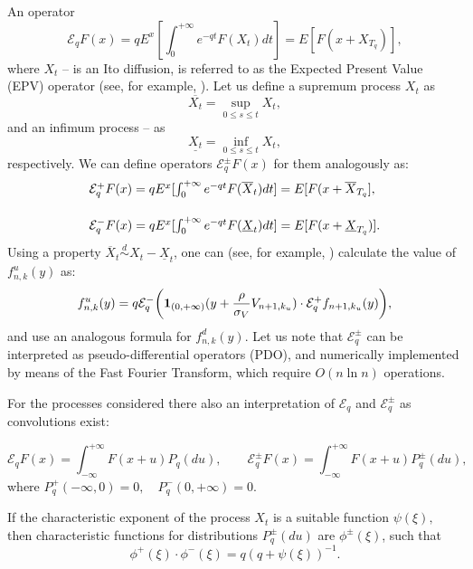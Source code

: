 \documentclass[a4paper]{jpconf}
\begin{document}
{An operator 
\begin{equation}\label{epv-operator}
\mathcal{E}_q F(x) = q E^x[\int_{0}^{+\infty} e^{-qt} F(X_t) dt] = E[F(x+X_{T_q})],
\end{equation}
where $X_t $ -- is an Ito diffusion, is referred to as the Expected Present Value (EPV) operator (see, for example, \cite{kudr_and_lev}). Let us define a supremum process $X_t$ as 
$$\overline{X_t} = \sup_{0\le s \le t} X_t,$$ 
and an infimum process -- as 
$$\underline{X_t} = \inf_{0\le s \le t} X_t,$$
respectively. We can define operators $\mathcal{E}^{\pm}_q F(x)$ for them analogously as:
\begin{equation*}
\begin{array}{l}
\mathcal{E}^{+}_q F(x) = q E^x[\int_{0}^{+\infty} e^{-qt}F(\overline{X}_t)dt] = E[F(x+\overline{X}_{T_q}], \\
\smallskip\\
\mathcal{E}^{-}_q F(x) = q E^x[\int_{0}^{+\infty} e^{-qt}F(\underline{X}_t)dt] = E[F(x + \underline{X}_{T_q})].
\end{array}
\end{equation*}
Using a property $\overline{X}_t \overset{d}{\sim} X_t - \underline{X}_t$, one can (see, for example, \cite{boya_lev}) calculate the value of $f^u_{n,k}(y)$ as:
\begin{equation*}
f^u_{n,k}(y) = q \mathcal{E}^{-}_{q} \biggr{(} {\bf 1}_{(0, +\infty)}(y+\frac{\rho}{\sigma_{V}}V_{n+1,k_u}) \cdot \mathcal{E}^{+}_{q}f_{n+1, k_u}(y) \biggr{)},
\end{equation*}
and use an analogous formula for $f^d_{n,k}(y)$. Let us note that $\mathcal{E}^{\pm}_{q}$ can be interpreted as pseudo-differential operators (PDO), and numerically implemented by means of the Fast Fourier Transform, which require $O(n\ln{n})$ operations.

For the processes considered there also an interpretation of $\mathcal{E}_q$ and $\mathcal{E}^\pm_q$ as convolutions exist:

$$ \mathcal{E}_q F(x) = \int_{-\infty}^{+\infty} F(x+u) P_q(du),\qquad \mathcal{E}^{\pm}_q F(x) = \int_{-\infty}^{+\infty} F(x+u) P^{\pm}_q(du),$$
where $P^{+}_q(-\infty, 0) = 0, \quad P^{-}_q(0, +\infty) = 0.$

If the characteristic exponent of the process $X_t$ is a suitable function $\psi(\xi),$ then characteristic functions for distributions $P^{\pm}_q(du)$ are $\phi^{\pm}(\xi)$, such that 
\begin{equation}\label{factorization-diffusion}
\phi^+(\xi) \cdot \phi^-(\xi) = q (q + \psi(\xi))^{-1}.
\end{equation}
 
}
\end{document}
